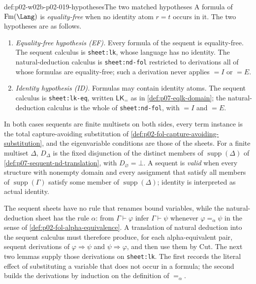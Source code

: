 \begin{hbdefinition}{def:p02-w02b-p02-019-hypotheses}{The two matched hypotheses}
A formula of \(\operatorname{Fm}(\Lang)\) is \emph{equality-free} when no
identity atom \(r=t\) occurs in it.  The two hypotheses are as follows.
\begin{enumerate}
 \item \emph{Equality-free hypothesis (EF).}  Every formula of the sequent is
   equality-free.  The sequent calculus is \texttt{sheet:lk}, whose language
   has no identity.  The natural-deduction calculus is
   \texttt{sheet:nd-fol} restricted to derivations all of whose formulas are
   equality-free; such a derivation never applies \(=I\) or \(=E\).
 \item \emph{Identity hypothesis (ID).}  Formulas may contain identity
   atoms.  The sequent calculus is \texttt{sheet:lk-eq}, written
   \(\mathsf{LK}_{=}\) as in \cref{def:p07-eqlk-domain}; the natural-deduction
   calculus is the whole of \texttt{sheet:nd-fol}, with \(=I\) and \(=E\).
\end{enumerate}
In both cases sequents are finite multisets on both sides, every term
instance is the total capture-avoiding substitution of
\cref{def:p02-fol-capture-avoiding-substitution}, and the eigenvariable
conditions are those of the sheets.  For a finite multiset \(\Delta\),
\(D_{\Delta}\) is the fixed disjunction of the distinct members of
\(\operatorname{supp}(\Delta)\) of \cref{def:p07-sequent-nd-translation},
with \(D_{\varnothing}=\bot\).  A sequent is \emph{valid} when every
structure with nonempty domain and every assignment that satisfy all members
of \(\operatorname{supp}(\Gamma)\) satisfy some member of
\(\operatorname{supp}(\Delta)\); identity is interpreted as actual identity.
\end{hbdefinition}

The sequent sheets have no rule that renames bound variables, while the
natural-deduction sheet has the rule \(\alpha\): from \(\Gamma\vdash\varphi\)
infer \(\Gamma\vdash\psi\) whenever \(\varphi=_{\alpha}\psi\) in the sense of
\cref{def:p02-fol-alpha-equivalence}.  A translation of natural deduction
into the sequent calculus must therefore produce, for each alpha-equivalent
pair, sequent derivations of \(\varphi\Rightarrow\psi\) and
\(\psi\Rightarrow\varphi\), and then use them by Cut.  The next two lemmas
supply those derivations on \texttt{sheet:lk}.  The first records the
literal effect of substituting a variable that does not occur in a formula;
the second builds the derivations by induction on the definition of
\(=_{\alpha}\).

